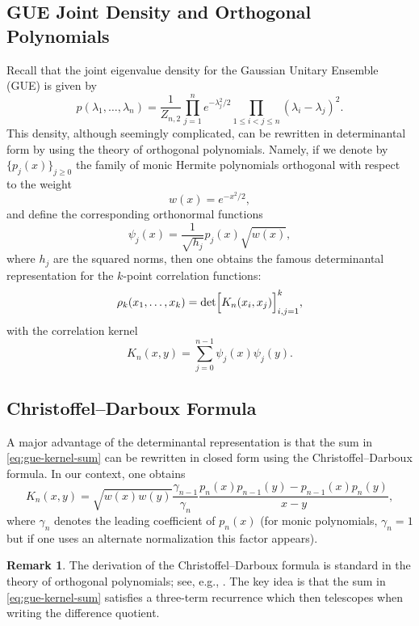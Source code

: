 \documentclass[letterpaper,11pt,oneside,reqno]{article}
\numberwithin{equation}{section}
\theoremstyle{definition}
\newtheorem{remark}[proposition]{Remark}
\begin{document}
\subsection{GUE Joint Density and Orthogonal Polynomials}
Recall that the joint eigenvalue density for the Gaussian Unitary Ensemble (GUE) is given by
\begin{equation}
\label{eq:gue-joint-density}
p(\lambda_1,\dots,\lambda_n)=\frac{1}{Z_{n,2}}\prod_{j=1}^n e^{-\lambda_j^2/2}\prod_{1\le i<j\le n} (\lambda_i-\lambda_j)^2.
\end{equation}
This density, although seemingly complicated, can be rewritten in determinantal form by using the theory of orthogonal polynomials. Namely, if we denote by $\{p_j(x)\}_{j\ge0}$ the family of monic Hermite polynomials orthogonal with respect to the weight
\[
w(x)=e^{-x^2/2},
\]
and define the corresponding orthonormal functions
\[
\psi_j(x)=\frac{1}{\sqrt{h_j}}p_j(x) \sqrt{w(x)},
\]
where $h_j$ are the squared norms, then one obtains the famous determinantal representation for the $k$-point correlation functions:
\begin{equation}
\label{eq:gue-correlation}
\rho_k(x_1,\dots,x_k)=\det\Bigl[K_n(x_i,x_j)\Bigr]_{i,j=1}^k,
\end{equation}
with the correlation kernel
\begin{equation}
\label{eq:gue-kernel-sum}
K_n(x,y)=\sum_{j=0}^{n-1}\psi_j(x)\psi_j(y).
\end{equation}

\subsection{Christoffel--Darboux Formula}
A major advantage of the determinantal representation is that the sum in \eqref{eq:gue-kernel-sum} can be rewritten in closed form using the Christoffel--Darboux formula. In our context, one obtains
\begin{equation}
\label{eq:CD}
K_n(x,y)=\sqrt{w(x)w(y)}\frac{\gamma_{n-1}}{\gamma_n}\frac{p_n(x)p_{n-1}(y)-p_{n-1}(x)p_n(y)}{x-y},
\end{equation}
where $\gamma_n$ denotes the leading coefficient of $p_n(x)$ (for monic polynomials, $\gamma_n=1$ but if one uses an alternate normalization this factor appears).

\begin{remark}
The derivation of the Christoffel--Darboux formula is standard in the theory of orthogonal polynomials; see, e.g., \cite{szego1975orthogonal}. The key idea is that the sum in \eqref{eq:gue-kernel-sum} satisfies a three-term recurrence which then telescopes when writing the difference quotient.
\end{remark}
\end{document}
